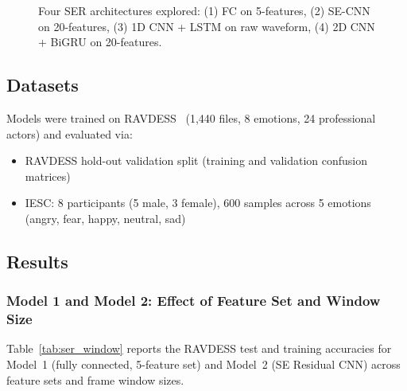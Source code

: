 \begin{figure}[h]
\caption{Four SER architectures explored: (1) FC on 5-features, (2) SE-CNN on 20-features, (3) 1D CNN + LSTM on raw waveform, (4) 2D CNN + BiGRU on 20-features.}
\label{fig:ser_models}
\end{figure}

\subsection{Datasets}

Models were trained on RAVDESS~\cite{Livingstone2018} (1,440 files, 8 emotions, 24 professional actors) and evaluated via:
\begin{itemize}
    \item RAVDESS hold-out validation split (training and validation confusion matrices)
    \item IESC: 8 participants (5 male, 3 female), 600 samples across 5 emotions (angry, fear, happy, neutral, sad)
\end{itemize}

\subsection{Results}

\subsubsection{Model 1 and Model 2: Effect of Feature Set and Window Size}

Table~\ref{tab:ser_window} reports the RAVDESS test and training accuracies for Model~1 (fully connected, 5-feature set) and Model~2 (SE Residual CNN) across feature sets and frame window sizes.

